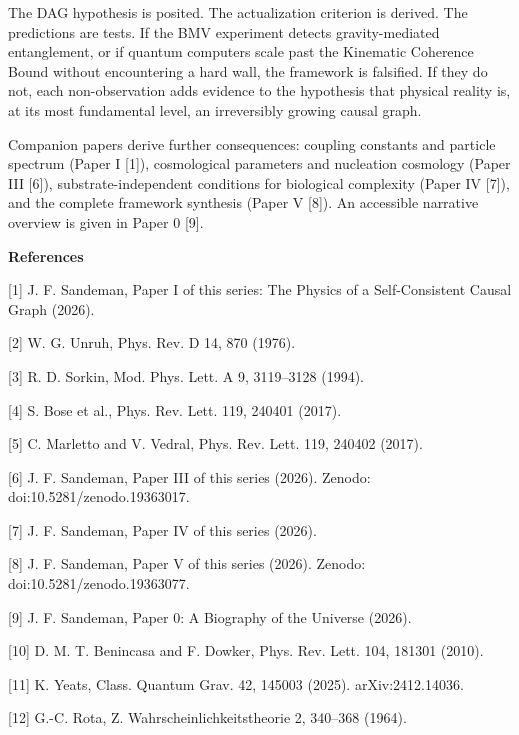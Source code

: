 \documentclass[12pt,a4paper]{article}
\begin{document}
The DAG hypothesis is posited. The actualization criterion is derived.
The predictions are tests. If the BMV experiment detects
gravity-mediated entanglement, or if quantum computers scale past the
Kinematic Coherence Bound without encountering a hard wall, the
framework is falsified. If they do not, each non-observation adds
evidence to the hypothesis that physical reality is, at its most
fundamental level, an irreversibly growing causal graph.

Companion papers derive further consequences: coupling constants and
particle spectrum (Paper I {[}1{]}), cosmological parameters and
nucleation cosmology (Paper III {[}6{]}), substrate-independent
conditions for biological complexity (Paper IV {[}7{]}), and the
complete framework synthesis (Paper V {[}8{]}). An accessible narrative
overview is given in Paper 0 {[}9{]}.

\textbf{References}

{[}1{]} J. F. Sandeman, Paper I of this series: The Physics of a
Self-Consistent Causal Graph (2026).

{[}2{]} W. G. Unruh, Phys. Rev. D 14, 870 (1976).

{[}3{]} R. D. Sorkin, Mod. Phys. Lett. A 9, 3119--3128 (1994).

{[}4{]} S. Bose et al., Phys. Rev. Lett. 119, 240401 (2017).

{[}5{]} C. Marletto and V. Vedral, Phys. Rev. Lett. 119, 240402 (2017).

{[}6{]} J. F. Sandeman, Paper III of this series (2026). Zenodo:
doi:10.5281/zenodo.19363017.

{[}7{]} J. F. Sandeman, Paper IV of this series (2026).

{[}8{]} J. F. Sandeman, Paper V of this series (2026). Zenodo:
doi:10.5281/zenodo.19363077.

{[}9{]} J. F. Sandeman, Paper 0: A Biography of the Universe (2026).

{[}10{]} D. M. T. Benincasa and F. Dowker, Phys. Rev. Lett. 104, 181301
(2010).

{[}11{]} K. Yeats, Class. Quantum Grav. 42, 145003 (2025).
arXiv:2412.14036.

{[}12{]} G.-C. Rota, Z. Wahrscheinlichkeitstheorie 2, 340--368 (1964).
\end{document}
